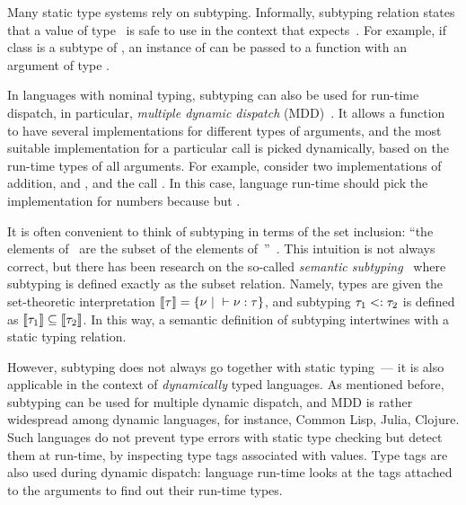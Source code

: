 Many static type systems rely on subtyping.
Informally, subtyping relation  states that
a value of type~ is safe to use 
in the context that expects~.
For example, if class  is a subtype of ,
an instance of  can be passed to a function
with an argument of type .

In languages with nominal typing, subtyping can also be used for run-time
dispatch, in particular, \emph{multiple dynamic dispatch} 
(MDD)~\cite{bib:Chambers:1992:Cecil,bib:Clifton:2000:MultiJava}.
It allows a function to have several implementations 
for different types of arguments,
and the most suitable implementation for a particular call 
is picked dynamically, based on the run-time types of all arguments.
For example, consider two implementations of addition,
 and ,
and the call .
In this case, language run-time should pick 
the implementation for numbers 
because  but .

It is often convenient to think of subtyping 
in terms of the set inclusion: ``the elements of~ are the subset
of the elements of~''~\cite{bib:Pierce:2002:TAPL}.
This intuition is not always correct, but there has been research on
the so-called \emph{semantic subtyping}~\cite{bib:Hosoya:2003:XDuce,
  bib:Frisch:2008:sem-sub, bib:Ancona:2016:sem-sub-oo} 
where subtyping is defined exactly as the subset relation. %
Namely, types are given the set-theoretic interpretation
$\llbracket \tau \rrbracket = \{\nu ~\vert~ \vdash \nu : \tau \}$, 
and subtyping $\tau_1 <: \tau_2$ is defined 
as $\llbracket \tau_1 \rrbracket \subseteq \llbracket \tau_2 \rrbracket$.
In this way, a semantic definition of subtyping intertwines with 
a static typing relation.

However, subtyping does not always go together with static typing~---
it is also applicable in the context of \emph{dynamically} typed languages.
As mentioned before, subtyping can be used for multiple dynamic dispatch,
and MDD is rather widespread among dynamic languages, for instance,
Common Lisp, Julia, Clojure.
Such languages do not prevent type errors with static type checking
but detect them at run-time, by inspecting type tags associated with values.
Type tags are also used during dynamic dispatch: 
language run-time looks at the tags attached to the arguments
to find out their run-time types.

